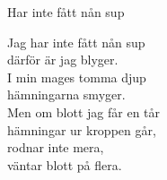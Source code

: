 \begin{song}{Har inte fått nån sup}
	
	
	
	Jag har inte fått nån sup\\
	därför är jag blyger.\\
	I min mages tomma djup\\
	hämningarna smyger.\\
	Men om blott jag får en tår\\
	hämningar ur kroppen går,\\
	rodnar inte mera,\\
	väntar blott på flera.
	
\end{song}
